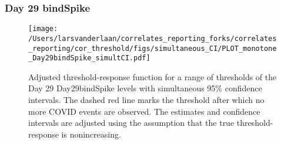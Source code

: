 \documentclass[]{article}
\begin{document}
\clearpage
\clearpage

\clearpage

\hypertarget{day-29-bindspike-2}{%
\subsubsection{Day 29 bindSpike}\label{day-29-bindspike-2}}

\begin{figure}[H]
\centering
\texttt{[image: /Users/larsvanderlaan/correlates\_reporting\_forks/correlates\_reporting/cor\_threshold/figs/simultaneous\_CI/PLOT\_monotone\_Day29bindSpike\_simultCI.pdf]}
\caption{Adjusted threshold-response function for a range of thresholds of the
  Day 29 Day29bindSpike levels with simultaneous 95\% confidence intervals. The dashed red line marks the threshold after which no more COVID events are observed. The estimates and confidence intervals are adjusted using the assumption that the true threshold-response is nonincreasing.}
\end{figure}
\end{document}
